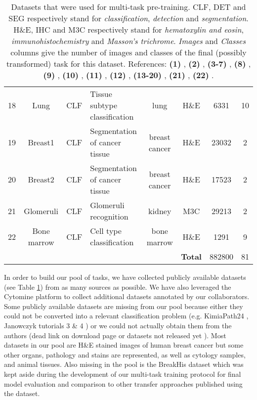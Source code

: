 \begin{table}[t]
\begin{tabular}{|r|c|c|l|c|c|c|c|}
18 & Lung & CLF & Tissue subtype classification & lung & H\&E & 6331 & 10 \\
19 & Breast1 & CLF & Segmentation of cancer tissue & breast cancer & H\&E & 23032 & 2 \\
20 & Breast2 & CLF & Segmentation of cancer tissue & breast cancer & H\&E & 17523 & 2 \\
21 & Glomeruli & CLF & Glomeruli recognition & kidney & M3C & 29213 & 2 \\
22 & Bone marrow & CLF & Cell type classification & bone marrow & H\&E & 1291 & 9 \\
        \hline 
\multicolumn{5}{|c|}{} & \textbf{Total} & 882800 & 81 \\
\hline
    \end{tabular}
    \caption{Datasets that were used for multi-task pre-training. CLF, DET and SEG respectively stand for \textit{classification}, \textit{detection} and \textit{segmentation}. H\&E, IHC and M3C respectively stand for \textit{hematoxylin and eosin}, \textit{immunohistochemistry} and \textit{Masson's trichrome}. \textit{Images} and \textit{Classes} columns give the number of images and classes of the final (possibly transformed) task for this dataset. References: \textbf{(1)} \cite{roux2014mitos}, \textbf{(2)} \cite{sirinukunwattana2016locality}, \textbf{(3-7)} \cite{janowczyk2016deep}, \textbf{(8)} \cite{linder2012identification}, \textbf{(9)} \cite{veta2019predicting}, \textbf{(10)} \cite{aresta2019bach}, \textbf{(11)} \cite{bejnordi2017diagnostic}, \textbf{(12)} \cite{kather2016multi}, \textbf{(13-20)} \cite{mormont2018comparison}, \textbf{(21)} \cite{maree2016approach} , \textbf{(22)} \cite{kainz2017training}.} 
    \label{tab:mtask:datasets}
\end{table}

In order to build our pool of tasks, we have collected publicly available datasets (see Table \ref{tab:mtask:datasets}) from as many sources as possible. We have also leveraged the Cytomine \cite{maree2016collaborative} platform to collect additional datasets annotated by our collaborators. Some publicly available datasets are missing from our pool because either they could not be converted into a relevant classification problem (e.g. KimiaPath24  \cite{babaie2017classification}, Janowczyk tutorials 3 \& 4 \cite{janowczyk2016deep}) or we could not actually obtain them from the authors (\eg dead link on download page or datasets not released yet \cite{gamper2019pannuke}). Most datasets in our pool are H\&E stained images of human breast cancer but some other organs, pathology and stains are represented, as well as cytology samples, and animal tissues. Also missing in the pool is the BreakHis dataset which was kept aside during the development of our multi-task training protocol for final model evaluation and comparison to other transfer approaches published using the dataset. 

